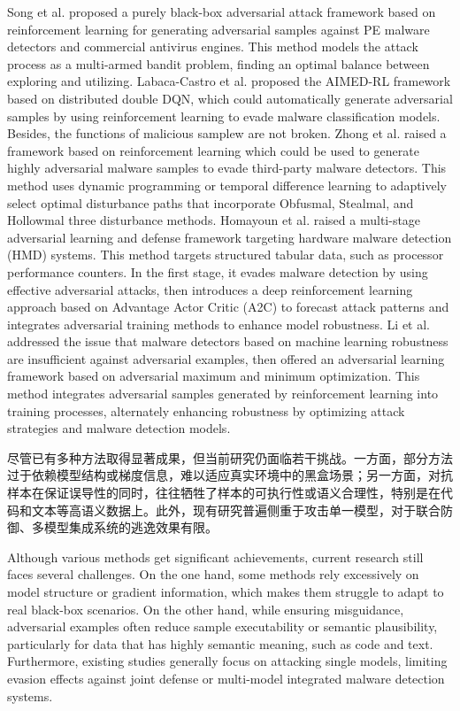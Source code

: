 Song et al. proposed a purely black-box adversarial attack framework based on reinforcement learning for generating adversarial samples against PE malware detectors and commercial antivirus engines\cite{song2022mab}. This method models the attack process as a multi-armed bandit problem, finding an optimal balance between exploring and utilizing. Labaca-Castro et al. proposed the AIMED-RL framework based on distributed double DQN\cite{labaca2021aimed}, which could automatically generate adversarial samples by using reinforcement learning to evade malware classification models. Besides, the functions of malicious samplew are not broken. Zhong et al. raised a framework based on reinforcement learning which could be used to generate highly adversarial malware samples to evade third-party malware detectors\cite{zhong2022reinforcement}. This method uses dynamic programming or temporal difference learning to adaptively select optimal disturbance paths that incorporate Obfusmal, Stealmal, and Hollowmal three disturbance methods. Homayoun et al. raised a multi-stage adversarial learning and defense framework targeting hardware malware detection (HMD) systems\cite{he2024beyond}. This method targets structured tabular data, such as processor performance counters. In the first stage, it evades malware detection by using effective adversarial attacks, then introduces a deep reinforcement learning approach based on Advantage Actor Critic (A2C) to forecast attack patterns and integrates adversarial training methods to enhance model robustness. Li et al. addressed the issue that malware detectors based on machine learning robustness are insufficient against adversarial examples\cite{ebrahimi2022adversarial}, then offered an adversarial learning framework based on adversarial maximum and minimum optimization. This method integrates adversarial samples generated by reinforcement learning into training processes, alternately enhancing robustness by optimizing attack strategies and malware detection models.

尽管已有多种方法取得显著成果，但当前研究仍面临若干挑战。一方面，部分方法过于依赖模型结构或梯度信息，难以适应真实环境中的黑盒场景；另一方面，对抗样本在保证误导性的同时，往往牺牲了样本的可执行性或语义合理性，特别是在代码和文本等高语义数据上。此外，现有研究普遍侧重于攻击单一模型，对于联合防御、多模型集成系统的逃逸效果有限。

Although various methods get significant achievements, current research still faces several challenges. On the one hand, some methods rely excessively on model structure or gradient information, which makes them struggle to adapt to real black-box scenarios. On the other hand, while ensuring misguidance, adversarial examples often reduce sample executability or semantic plausibility, particularly for data that has highly semantic meaning, such as code and text. Furthermore, existing studies generally focus on attacking single models, limiting evasion effects against joint defense or multi-model integrated malware detection systems.


